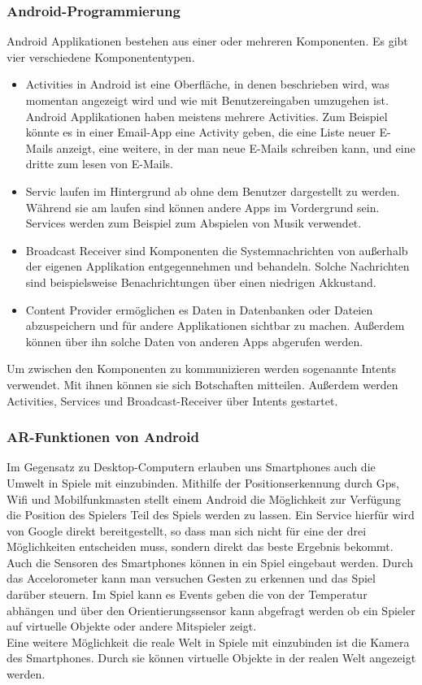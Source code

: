 \documentclass[extern,palatino]{cgBA}
\begin{document}
	\subsubsection{Android-Programmierung}Android Applikationen bestehen aus einer oder  mehreren Komponenten. Es gibt vier verschiedene Komponententypen.
	\begin{itemize}
		\item 
		Activities in Android ist eine Oberfläche, in denen beschrieben wird, was momentan angezeigt wird und wie mit Benutzereingaben umzugehen ist. Android Applikationen haben meistens mehrere Activities. Zum Beispiel könnte es in einer Email-App eine Activity geben, die eine Liste neuer E-Mails anzeigt, eine weitere, in der man neue E-Mails schreiben kann, und eine dritte zum lesen von E-Mails. 
		\item
		Servic laufen im Hintergrund ab ohne dem Benutzer dargestellt zu werden. Während sie am laufen sind können andere Apps im Vordergrund sein. Services werden zum Beispiel zum  Abspielen von Musik verwendet.
		\item Broadcast Receiver sind Komponenten die Systemnachrichten von außerhalb der eigenen Applikation entgegennehmen und behandeln. Solche Nachrichten sind beispielsweise Benachrichtungen über einen niedrigen Akkustand.
		\item Content Provider ermöglichen es Daten in Datenbanken oder Dateien abzuspeichern und für andere Applikationen sichtbar zu machen. Außerdem können über ihn solche Daten von anderen Apps abgerufen werden.
	\end{itemize}
	Um zwischen den Komponenten zu kommunizieren werden sogenannte Intents verwendet. Mit ihnen können sie sich Botschaften mitteilen. Außerdem werden Activities, Services und Broadcast-Receiver über Intents gestartet.
	\subsubsection{AR-Funktionen von Android}
	Im Gegensatz zu Desktop-Computern erlauben uns Smartphones auch die Umwelt in Spiele mit einzubinden. Mithilfe der Positionserkennung durch Gps, Wifi und Mobilfunkmasten stellt einem Android die Möglichkeit zur Verfügung die Position des Spielers Teil des Spiels werden zu lassen. Ein Service hierfür wird von Google direkt bereitgestellt, so dass man sich nicht für eine der drei Möglichkeiten entscheiden muss, sondern direkt das beste Ergebnis bekommt.\\
	Auch die Sensoren des Smartphones können in ein Spiel eingebaut werden. Durch das Accelorometer kann man versuchen Gesten zu erkennen und das Spiel darüber steuern. Im Spiel kann es Events geben die von der Temperatur abhängen und über den Orientierungssensor kann abgefragt werden ob ein Spieler auf virtuelle Objekte oder andere Mitspieler zeigt.\\
	Eine weitere Möglichkeit die reale Welt in Spiele mit einzubinden ist die Kamera des Smartphones. Durch sie können virtuelle Objekte in der realen Welt angezeigt werden. 
	\newpage
\end{document}
